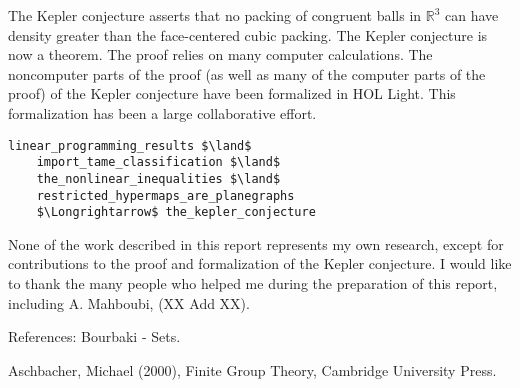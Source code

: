 \documentclass[brochure,english,12pt]{bourbaki}
\theoremstyle{plain}
\def\ring#1{{\mathbb{#1}}}
\begin{document}
The Kepler conjecture asserts that no packing of congruent balls in $\ring{R}^3$ can have density greater than
the face-centered cubic packing.  The Kepler conjecture is now a theorem.  The proof relies on many computer
calculations.  The noncomputer parts of the proof (as well as many of the computer parts of the proof) of the Kepler conjecture 
have been formalized in HOL Light.  This formalization has been a large collaborative effort.

\begin{lstlisting}[keepspaces=true,stringstyle=\tt,basicstyle=\small,frame=single,framesep=8pt,framextopmargin=10pt,mathescape,morekeywords={Variable,Theorem,Proof,Qed},columns=flexible,caption={The formal proof of the Kepler conjecture in HOL Light}]
    linear_programming_results $\land$      
    import_tame_classification $\land$      
    the_nonlinear_inequalities $\land$
    restricted_hypermaps_are_planegraphs    
    $\Longrightarrow$ the_kepler_conjecture
\end{lstlisting}


None of the work described in this report represents my own research, except for contributions to the
proof and formalization of the Kepler conjecture.  I would like to thank the many people who helped me
during the preparation of this report, including A. Mahboubi, (XX Add XX).



\raggedright



References: Bourbaki - Sets.

Aschbacher, Michael (2000), Finite Group Theory, Cambridge University Press.
\end{document}
